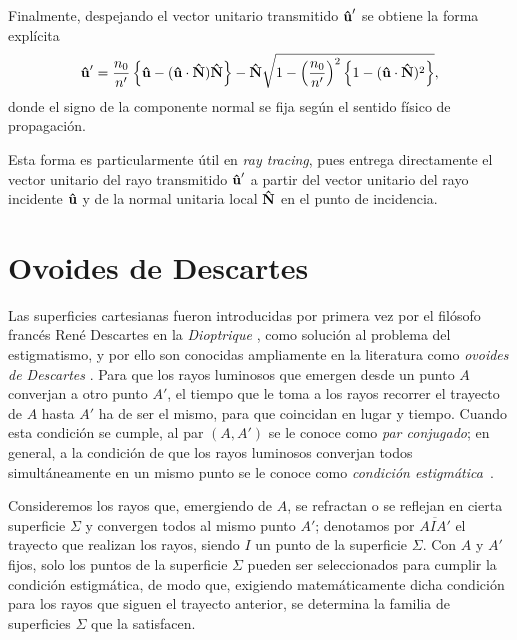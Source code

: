 Finalmente, despejando el vector unitario transmitido $\bm{\hat{\mathbf{u}}}'$ se obtiene la forma explícita
%
\begin{equation}
  \bm{\hat{\mathbf{u}}}'
  =
  \frac{n_0}{n'}
  \left\{
    \bm{\hat{\mathbf{u}}} - (\bm{\hat{\mathbf{u}}}\cdot\bm{\hat{\mathbf{N}}})\bm{\hat{\mathbf{N}}}
  \right\}
  -
  \bm{\hat{\mathbf{N}}}
  \sqrt{
    1 - \left(\frac{n_0}{n'}\right)^2
    \left\{
      1 - (\bm{\hat{\mathbf{u}}}\cdot\bm{\hat{\mathbf{N}}})^2
    \right\}
  },
  \label{eq:vectorial_law_of_snell_descartes}
\end{equation}
%
donde el signo de la componente normal se fija según el sentido físico de propagación.

Esta forma es particularmente útil en \emph{ray tracing}, pues entrega directamente el vector unitario del rayo transmitido $\bm{\hat{\mathbf{u}}}'$ a partir del vector unitario del rayo incidente $\bm{\hat{\mathbf{u}}}$ y de la normal unitaria local $\bm{\hat{\mathbf{N}}}$ en el punto de incidencia.



\section{Ovoides de Descartes} 

Las superficies cartesianas fueron introducidas por primera vez por el filósofo francés René Descartes en la \emph{Dioptrique} \cite{dioptrique}, como solución al problema del estigmatismo, y por ello son conocidas ampliamente en la literatura como \emph{ovoides de Descartes} \cite{ovoids2023}. Para que los rayos luminosos que emergen desde un punto $A$ converjan a otro punto $A'$, el tiempo que le toma a los rayos recorrer el trayecto de $A$ hasta $A'$ ha de ser el mismo, para que coincidan en lugar y tiempo. Cuando esta condición se cumple, al par $(A, A')$ se le conoce como \emph{par conjugado}; en general, a la condición de que los rayos luminosos converjan todos simultáneamente en un mismo punto se le conoce como \emph{condición estigmática}~\cite{bornwolf1999}.

Consideremos los rayos que, emergiendo de $A$, se refractan o se reflejan en cierta superficie $\Sigma$ y convergen todos al mismo punto $A'$; denotamos por $\overline{AIA'}$ el trayecto que realizan los rayos, siendo $I$ un punto de la superficie $\Sigma$. Con $A$ y $A'$ fijos, solo los puntos de la superficie $\Sigma$ pueden ser seleccionados para cumplir la condición estigmática, de modo que, exigiendo matemáticamente dicha condición para los rayos que siguen el trayecto anterior, se determina la familia de superficies $\Sigma$ que la satisfacen.

